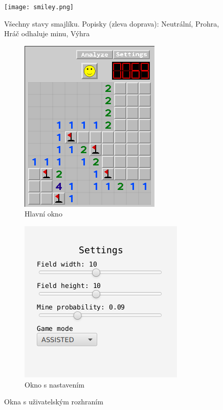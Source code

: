 \begin{figure}
    \centering
    \texttt{[image: smiley.png]}
    \caption{Všechny stavy smajlíku. Popisky (zleva doprava): Neutrální, Prohra, Hráč odhaluje minu, Výhra}
    \label{fig:stavy smajlíku}
\end{figure}

\begin{figure}
    \centering
    \begin{subfigure}[b]{0.3\textwidth}
        \centering
        \includegraphics[scale=0.5]{images/okno1.png}
        \caption{Hlavní okno}
        \label{fig:okno1}
    \end{subfigure}
    \begin{subfigure}[b]{0.3\textwidth}
        \centering
        \includegraphics[scale=0.5]{images/okno2.png}
        \caption{Okno s nastavením}
        \label{fig:okno2}
    \end{subfigure}
    \caption{Okna s uživatelským rozhraním}
    \label{fig:okna}
\end{figure}

